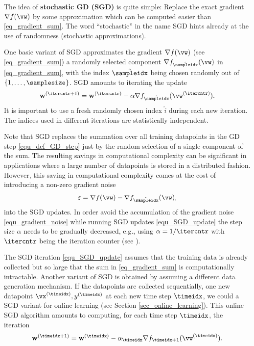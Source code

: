 \documentclass[12pt]{report}
\begin{document}
The idea of {\bf stochastic GD (SGD)} is quite simple: Replace the exact gradient $\nabla f(\vw)$ 
by some approximation which can be computed easier than \eqref{eq_gradient_sum}. The word ``stochastic'' 
in the name SGD hints already at the use of randomness (stochastic approximations). 

One basic variant of SGD approximates the gradient $\nabla f(\vw)$ (see \eqref{eq_gradient_sum}) 
a randomly selected component $\nabla f_{\hat{\sampleidx}}(\vw)$ in \eqref{eq_gradient_sum}, 
with the index $\hat{\sampleidx}$ being chosen randomly out of $\{1,\ldots,\samplesize\}$. SGD 
amounts to iterating the update 
\begin{equation}
\label{equ_SGD_update}
\mathbf{w}^{(\itercntr+1)} = \mathbf{w}^{(\itercntr)} - \alpha \nabla f_{\hat{\sampleidx}}(\vw^{(\itercntr)}).
\end{equation} 
It is important to use a fresh randomly chosen index $\hat{i}$ during each new iteration. 
The indices used in different iterations are statistically independent. 

Note that SGD replaces the summation over all training datapoints in the GD step 
\eqref{equ_def_GD_step} just by the random selection of a single component of the sum. 
The resulting savings in computational complexity can be significant in applications 
where a large number of  datapoints is stored in a distributed fashion. However, this 
saving in computational complexity comes at the cost of introducing a non-zero 
gradient noise 
\begin{equation}
\label{equ_gradient_noise}
\varepsilon = \nabla f(\vw)  - \nabla f_{\hat{\sampleidx}}(\vw), 
\end{equation} 
into the SGD updates. In order avoid the accumulation of the gradient noise \eqref{equ_gradient_noise} 
while running SGD updates \eqref{equ_SGD_update} the step size $\alpha$ needs to be gradually 
decreased, e.g., using $\alpha = 1/\itercntr$ with $\itercntr$ being the iteration counter (see \cite{Murata98astatistical}). 

The SGD iteration \eqref{equ_SGD_update} assumes that the training data is already 
collected but so large that the sum in \eqref{eq_gradient_sum} is computationally intractable. 
Another variant of SGD is obtained by assuming a different data generation 
mechanism. If the datapoints are collected sequentially, one new datapoint $\vx^{(\timeidx)},y^{(\timeidx)}$ 
at each new time step $\timeidx$, we could a SGD variant for online learning 
(see Section \ref{sec_online_learning}). This online SGD algorithm amounts to 
computing, for each time step $\timeidx$, the iteration 
\begin{equation}
\label{equ_SGD_update_timeiedx}
\mathbf{w}^{(\timeidx+1)} = \mathbf{w}^{(\timeidx)} - \alpha_{\timeidx} \nabla f_{\timeidx+1}(\vw^{(\timeidx)}).
\end{equation} 
\end{document}
